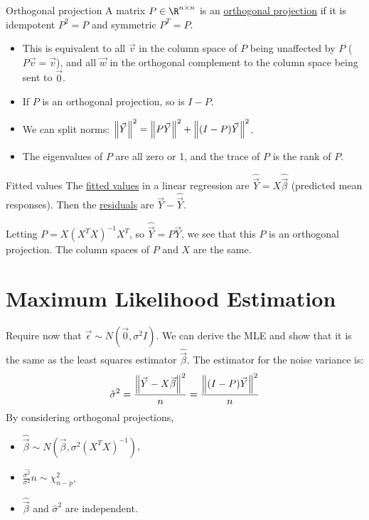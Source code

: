 \documentclass[../Main.tex]{subfiles}
\begin{document}
\begin{definition}{Orthogonal projection}
    A matrix $P \in \R^{n \times n}$ is an \underline{orthogonal projection} if it is idempotent $P^2 = P$ and symmetric $P^T = P$.
\end{definition}
\begin{itemize}
    \item This is equivalent to all $\vec{v}$ in the column space of $P$ being unaffected by $P$ ($P\vec{v} = \vec{v}$), and all $\vec{w}$ in the orthogonal complement to the column space being sent to $\vec0$.
    \item If $P$ is an orthogonal projection, so is $I - P$.
    \item We can split norms: $\left\|\vec{Y}\right\|^2 = \left\|P\vec{Y}\right\|^2 + \left\|(I - P)\vec{Y}\right\|^2$.
    \item The eigenvalues of $P$ are all zero or 1, and the trace of $P$ is the rank of $P$.
\end{itemize}
\begin{definition}{Fitted values}
    The \underline{fitted values} in a linear regression are $\hat{\vec{Y}} = X\hat{\vec{\beta}}$ (predicted mean responses). Then the \underline{residuals} are $\vec{Y} - \hat{\vec{Y}}$.
\end{definition}
Letting $P = X(X^TX)^{-1}X^T$, so $\hat{\vec{Y}} = P\vec{Y}$, we see that this $P$ is an orthogonal projection. The column spaces of $P$ and $X$ are the same.
\section{Maximum Likelihood Estimation}
Require now that $\vec{\epsilon} \sim N(\vec0, \sigma^2 I)$. We can derive the MLE and show that it is the same as the least squares estimator $\hat{\vec{\beta}}$. The estimator for the noise variance is:
\begin{equation*}
    \hat{\sigma}^2 = \frac{\left\|\vec{Y} - X\vec{\beta}\right\|^2}{n} = \frac{\left\|(I-P)\vec{Y}\right\|^2}{n}
\end{equation*}
By considering orthogonal projections,
\begin{itemize}
    \item $\hat{\vec{\beta}} \sim N(\vec{\beta}, \sigma^2 (X^TX)^{-1})$,
    \item $\frac{\hat{\sigma^2}}{\sigma^2} n \sim \chi_{n-p}^2$,
    \item $\hat{\vec{\beta}}$ and $\hat{\sigma}^2$ are independent.
\end{itemize}
\end{document}
